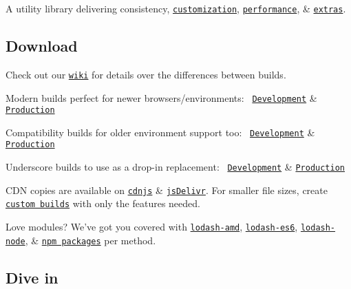 A utility library delivering consistency, \href{https://lodash.com/custom-builds}{\tt customization}, \href{https://lodash.com/benchmarks}{\tt performance}, \& \href{https://lodash.com/#features}{\tt extras}.

\subsection*{Download}

Check out our \href{[https://github.com/lodash/lodash/wiki/build-differences]}{\tt wiki} for details over the differences between builds.


\begin{DoxyItemize}
\item Modern builds perfect for newer browsers/environments\+:~\newline
 \href{https://raw.github.com/lodash/lodash/2.4.2/dist/lodash.js}{\tt Development} \& \href{https://raw.github.com/lodash/lodash/2.4.2/dist/lodash.min.js}{\tt Production}
\item Compatibility builds for older environment support too\+:~\newline
 \href{https://raw.github.com/lodash/lodash/2.4.2/dist/lodash.compat.js}{\tt Development} \& \href{https://raw.github.com/lodash/lodash/2.4.2/dist/lodash.compat.min.js}{\tt Production}
\item Underscore builds to use as a drop-\/in replacement\+:~\newline
 \href{https://raw.github.com/lodash/lodash/2.4.2/dist/lodash.underscore.js}{\tt Development} \& \href{https://raw.github.com/lodash/lodash/2.4.2/dist/lodash.underscore.min.js}{\tt Production}
\end{DoxyItemize}

C\+DN copies are available on \href{http://cdnjs.com/libraries/lodash.js/}{\tt cdnjs} \& \href{http://www.jsdelivr.com/#!lodash}{\tt js\+Delivr}. For smaller file sizes, create \href{https://lodash.com/custom-builds}{\tt custom builds} with only the features needed.

Love modules? We’ve got you covered with \href{https://npmjs.org/package/lodash-amd}{\tt lodash-\/amd}, \href{https://github.com/lodash/lodash-es6}{\tt lodash-\/es6}, \href{https://npmjs.org/package/lodash-node}{\tt lodash-\/node}, \& \href{https://npmjs.org/browse/keyword/lodash-modularized}{\tt npm packages} per method.

\subsection*{Dive in}

